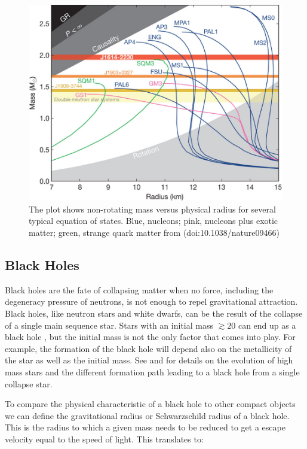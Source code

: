 \begin{figure}[]
        \centering
\includegraphics[scale=.3]{assets/images/es.jpg}
\caption{The plot shows non-rotating mass versus physical radius for several typical equation of states.  Blue, nucleons; pink, nucleons plus exotic matter; green, strange quark matter from (doi:10.1038/nature09466)}
\label{fig:nsmod}
\end{figure}

\subsection{Black Holes}\label{sec:bh}

Black holes are the fate of collapsing matter when no force, including the degeneracy pressure of neutrons, is not enough to repel gravitational attraction. Black holes,  like neutron stars and white dwarfs, can be the result of the collapse of a single main sequence star. Stars with an initial mass $\gtrsim  20$ can end up as a black hole \citep{heger_how_2003}, but the initial mass is not the only factor that comes into play. For example, the formation of the black hole will depend also on the metallicity of the star as well as the initial mass. See \cite{heger_how_2003} and \citep{brown_evolution_2000} for details on the evolution of high mass stars and the different formation path leading to a black hole from a single collapse star. 

To compare the physical characteristic of a black hole to other compact objects we can define the gravitational radius or Schwarzschild radius of a black hole. This is the radius to which a given mass needs to be reduced to get a escape velocity equal to the speed of light. This translates to:

